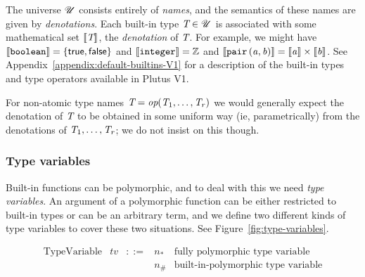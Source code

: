 

The universe $\mathscr{U}$ consists entirely of \textit{names}, and the semantics of
these names are given by \textit{denotations}. Each built-in type $\textit{T} \in \mathscr{U}$
is associated with some mathematical set $\llbracket\mathit{\textit{T}}\rrbracket$, the \textit{denotation}
of $\textit{T}$. For example, we might have $\llbracket\mathit{\texttt{boolean}}\rrbracket=
\{\mathsf{true}, \mathsf{false}\}$ and $\llbracket\mathit{\texttt{integer}}\rrbracket = \mathbb{Z}$
and $\llbracket\mathit{\mathtt{pair}\,\mathtt{(}a\mathtt{,}\,b\mathtt{)}}\rrbracket = \llbracket\mathit{a}\rrbracket \times \llbracket\mathit{b}\rrbracket$.  See
Appendix~\ref{appendix:default-builtins-V1} for a description of the
built-in types and type operators available in Plutus V1.%

For non-atomic type names $\textit{T} = \textit{op}(\textit{T}_1, \ldots, \textit{T}_r)$ we would generally
expect the denotation of $\textit{T}$ to be obtained in some uniform way (ie,
parametrically) from the denotations of $\textit{T}_1, \ldots, \textit{T}_r$; we do not insist
on this though.

\newcommand{\tv}{\ensuremath{\textit{tv}}}

\subsubsection{Type variables}
\label{sec:type-variables}
Built-in functions can be polymorphic, and to deal with this we need
\textit{type variables}.  An argument of a polymorphic function can be either
restricted to built-in types or can be an arbitrary term, and we define two
different kinds of type variables to cover these two situations.  See
Figure~\ref{fig:type-variables}.

\begin{minipage}{\linewidth}
  \centering
      \[\begin{array}{lrclr}
        \textrm{TypeVariable}    & \tv & ::= & n_{*} & \textrm{fully polymorphic type variable}\\
                                 &           &      & n_{\#} & \textrm{built-in-polymorphic type variable}\\
    \end{array}\]
    \label{fig:type-variables}
\end{minipage}

